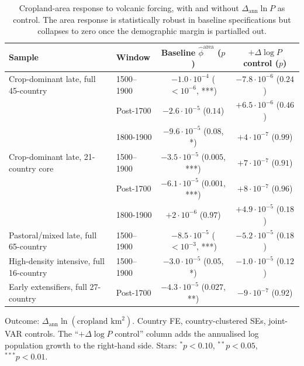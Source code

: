 \documentclass[11pt,letterpaper]{article}
\begin{document}
\begin{table}[H]
\centering
\caption{Cropland-area response to volcanic forcing, with and without $\Delta_{\text{ann}} \ln P$ as control. The area response is statistically robust in baseline specifications but collapses to zero once the demographic margin is partialled out.}
\label{tab:area-orthogonality}
\small
\begin{tabular}{llcc}
\toprule
Sample & Window & Baseline $\hat\phi^{\text{area}}$ ($p$) & $+\Delta \log P$ control ($p$) \\
\midrule
Crop-dominant late, full 45-country     & 1500--1900 & $-1.0\!\cdot\!10^{-4}$ \quad ($<10^{-6}$, ***) & $-7.8\!\cdot\!10^{-6}$ ($0.24$) \\
                                         & Post-1700  & $-2.6\!\cdot\!10^{-5}$ ($0.14$)              & $+6.5\!\cdot\!10^{-6}$ ($0.46$) \\
                                         & 1800-1900  & $-9.6\!\cdot\!10^{-5}$ ($0.08$, *)           & $+4\!\cdot\!10^{-7}$ ($0.99$) \\
\midrule
Crop-dominant late, 21-country core      & 1500--1900 & $-3.5\!\cdot\!10^{-5}$ ($0.005$, ***)        & $+7\!\cdot\!10^{-7}$ ($0.91$) \\
                                         & Post-1700  & $-6.1\!\cdot\!10^{-5}$ ($0.001$, ***)        & $+8\!\cdot\!10^{-7}$ ($0.96$) \\
                                         & 1800-1900  & $+2\!\cdot\!10^{-6}$ ($0.97$)                & $+4.9\!\cdot\!10^{-5}$ ($0.18$) \\
\midrule
Pastoral/mixed late, full 65-country     & 1500--1900 & $-8.5\!\cdot\!10^{-5}$ ($<10^{-3}$, ***)     & $-5.2\!\cdot\!10^{-5}$ ($0.18$) \\
High-density intensive, full 16-country  & 1500--1900 & $-3.0\!\cdot\!10^{-5}$ ($0.05$, *)           & $-1.0\!\cdot\!10^{-5}$ ($0.12$) \\
Early extensifiers, full 27-country      & Post-1700  & $-4.3\!\cdot\!10^{-5}$ ($0.027$, **)         & $-9\!\cdot\!10^{-7}$ ($0.92$) \\
\bottomrule
\end{tabular}
\par\smallskip\footnotesize{Outcome: $\Delta_{\text{ann}} \ln (\text{cropland km}^2)$. Country FE, country-clustered SEs, joint-VAR controls. The ``$+\Delta \log P$ control'' column adds the annualised log population growth to the right-hand side. Stars: $^{*}p<0.10$, $^{**}p<0.05$, $^{***}p<0.01$.}
\end{table}
\end{document}
